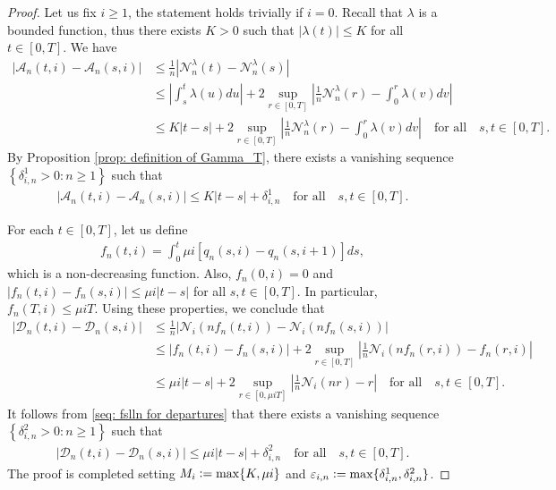 \documentclass[a4paper, 12pt]{article}
\theoremstyle{definition}
\newcommand{\set}[2]{\left\{#1 : #2\right\}}
\newcommand{\defeq}{\vcentcolon=}
\newcommand{\calA}{\mathcal{A}}
\newcommand{\calD}{\mathcal{D}}
\newcommand{\calN}{\mathcal{N}}
\begin{document}
\begin{appendices}
	\begin{proof}
	Let us fix $i \geq 1$, the statement holds trivially if $i = 0$. Recall that $\lambda$ is a bounded function, thus there exists $K > 0$ such that $|\lambda(t)| \leq K$ for all $t \in [0, T]$. We have
	\begin{align*}
		\left|\calA_n(t, i) - \calA_n(s, i)\right| &\leq \frac{1}{n} \left|\calN_n^\lambda(t) - \calN_n^\lambda(s)\right| \\
		&\leq \left|\int_s^t \lambda(u)du\right| + 2\sup_{r \in [0, T]} \left|\frac{1}{n}\calN_n^\lambda(r) - \int_0^r \lambda(v)dv\right| \\
		&\leq K|t - s| + 2\sup_{r \in [0, T]} \left|\frac{1}{n}\calN_n^\lambda(r) - \int_0^r \lambda(v)dv\right| \quad \text{for all} \quad s, t \in [0, T].
	\end{align*}
	By Proposition \ref{prop: definition of Gamma_T}, there exists a vanishing sequence $\set{\delta_{i, n}^1 > 0}{n \geq 1}$ such that
	\begin{align*}
		\left|\calA_n(t, i) - \calA_n(s, i)\right| \leq K|t - s| + \delta_{i, n}^1 \quad \text{for all} \quad s, t \in [0, T].
	\end{align*}
	
	For each $t \in [0, T]$, let us define
	\begin{align*}
		f_n(t, i) = \int_0^t \mu i\left[q_n(s, i) - q_n(s, i + 1)\right]ds,
	\end{align*}
	which is a non-decreasing function. Also, $f_n(0, i) = 0$ and $|f_n(t, i) - f_n(s, i)| \leq \mu i|t - s|$ for all $s, t \in [0, T]$. In particular, $f_n(T, i) \leq \mu i T$. Using these properties, we conclude that
	\begin{align*}
		\left|\calD_n(t, i) - \calD_n(s, i)\right| &\leq \frac{1}{n} \left|\calN_i\left(n f_n(t, i)\right) - \calN_i\left(n f_n(s, i)\right)\right| \\
		&\leq |f_n(t, i) - f_n(s, i)| + 2\sup_{r \in [0, T]} \left|\frac{1}{n}\calN_i\left(n f_n(r, i)\right) - f_n(r, i)\right| \\
		&\leq \mu i|t - s| + 2\sup_{r \in [0, \mu iT]} \left|\frac{1}{n}\calN_i(n r) - r\right| \quad \text{for all} \quad s, t \in [0, T].
	\end{align*}
	It follows from \eqref{seq: fslln for departures} that there exists a vanishing sequence $\set{\delta_{i, n}^2 > 0}{n \geq 1}$ such that
	\begin{align*}
		\left|\calD_n(t, i) - \calD_n(s, i)\right| \leq \mu i|t - s| + \delta_{i, n}^2 \quad \text{for all} \quad s, t \in [0, T].
	\end{align*}
	The proof is completed setting $M_i \defeq \max\{K, \mu i\}$ and $\varepsilon_{i, n} \defeq \max\{\delta_{i, n}^1, \delta_{i, n}^2\}$.
	\end{proof}
	

\end{appendices}
\end{document}
